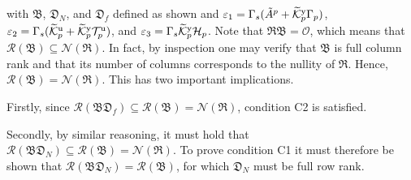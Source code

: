 with $\mathfrak{B}$, $\mathfrak{D}_N$, and $\mathfrak{D}_f$ defined as shown and $\varepsilon_1=\Gamma_s(\tilde{A}^p+\widetilde{\mathcal{K}}_{p}^{\mathrm{{y}}}\Gamma_p)$, $\varepsilon_2=\Gamma_s(\widetilde{\mathcal{K}}_{p}^{\mathrm{{u}}}+\widetilde{\mathcal{K}}_{p}^{\mathrm{{y}}}\mathcal{T}_p^\mathrm{u})$, and $\varepsilon_3=\Gamma_s\widetilde{\mathcal{K}}_{p}^{\mathrm{{y}}}\mathcal{H}_p$. Note that $\mathfrak{RB}=\mathcal{O}$, which means that $\mathcal{R}(\mathfrak{B})\subseteq\mathcal{N}(\mathfrak{R})$. In fact, by inspection one may verify that $\mathfrak{B}$ is full column rank and that its number of columns corresponds to the nullity of $\mathfrak{R}$. Hence, $\mathcal{R}(\mathfrak{B})=\mathcal{N}(\mathfrak{R})$. This has two important implications.

Firstly, since ${\mathcal{R}(\mathfrak{BD}_f)\subseteq\mathcal{R}(\mathfrak{B})=\mathcal{N}(\mathfrak{R})}$, condition C2 is satisfied.

Secondly, by similar reasoning, it must hold that ${\mathcal{R}(\mathfrak{BD}_N)\subseteq\mathcal{R}(\mathfrak{B})=\mathcal{N}(\mathfrak{R})}$. To prove condition C1 it must therefore be shown that $\mathcal{R}(\mathfrak{BD}_N)=\mathcal{R}(\mathfrak{B})$, for which $\mathfrak{D}_N$ must be full row rank.
